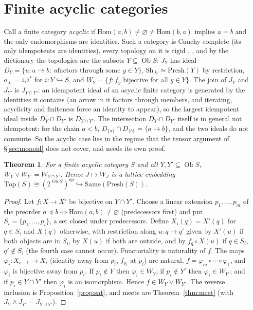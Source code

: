 \documentclass[11pt]{amsart}
\newtheorem{thm}{Theorem}[section]
\theoremstyle{definition}
\newcommand{\Same}{\mathrm{Same}}
\newcommand{\Top}{\mathrm{Top}}
\newcommand{\Presh}{\mathrm{Presh}}
\newcommand{\Sh}{\mathrm{Sh}}
\newcommand{\Hom}{\mathrm{Hom}}
\begin{document}
\section{Finite acyclic categories}\label{sec:acyclic}

Call a finite category \emph{acyclic} if $\Hom(a,b)\neq\varnothing\neq\Hom(b,a)$
implies $a=b$ and the only endomorphisms are identities. Such a category is
Cauchy complete (its only idempotents are identities), every topology on it is
rigid \cite[C2.2.21]{Elephant}, \cite{Marques25}, and by the dictionary the topologies are the subsets
$Y\subseteq\operatorname{Ob}S$: $J_Y$ has ideal $D_Y=\{u\colon a\to b:\ u\text{
factors through some }y\in Y\}$, $\Sh_{J_Y}\simeq\Presh(Y)$ by restriction,
$a_{J_Y}=i_*i^*$ for $i\colon Y\hookrightarrow S$, and
$W_Y=\{f: f_y\text{ bijective for all }y\in Y\}$. The join of $J_Y$ and $J_{Y'}$
is $J_{Y\cap Y'}$: an idempotent ideal of an acyclic finite category is
generated by the identities it contains (an arrow in it factors through
members, and iterating, acyclicity and finiteness force an identity to
appear), so the largest idempotent ideal inside $D_Y\cap D_{Y'}$ is
$D_{Y\cap Y'}$. The intersection $D_Y\cap D_{Y'}$ itself is in general not
idempotent: for the chain $a<b$, $D_{\{a\}}\cap D_{\{b\}}=\{a\to b\}$, and the
two ideals do not commute. So the acyclic case lies in the regime that the
tensor argument of \S\ref{sec:monoid} does not cover, and needs its own proof.

\begin{thm}\label{thm:acyclic}
For a finite acyclic category $S$ and all $Y,Y'\subseteq\operatorname{Ob}S$,
$W_Y\vee W_{Y'}=W_{Y\cap Y'}$. Hence $J\mapsto W_J$ is a lattice embedding
$\Top(S)\cong(2^{\operatorname{Ob}S})^{\mathrm{op}}\hookrightarrow\Same(\Presh(S))$.
\end{thm}
\begin{proof}
Let $f\colon X\to X'$ be bijective on $Y\cap Y'$. Choose a linear extension
$p_1,\dots,p_m$ of the preorder $a\preceq b\iff\Hom(a,b)\neq\varnothing$
(predecessors first) and put $S_i=\{p_1,\dots,p_i\}$, a set closed under
predecessors. Define $X_i(q)=X'(q)$ for $q\in S_i$ and $X(q)$ otherwise, with
restriction along $u\colon q\to q'$ given by $X'(u)$ if both objects are in
$S_i$, by $X(u)$ if both are outside, and by $f_q\circ X(u)$ if $q\in S_i$,
$q'\notin S_i$ (the fourth case cannot occur). Functoriality is naturality of
$f$. The maps $\varphi_i\colon X_{i-1}\to X_i$ (identity away from $p_i$,
$f_{p_i}$ at $p_i$) are natural, $f=\varphi_m\circ\cdots\circ\varphi_1$, and
$\varphi_i$ is bijective away from $p_i$. If $p_i\notin Y$ then
$\varphi_i\in W_Y$; if $p_i\notin Y'$ then $\varphi_i\in W_{Y'}$; and if
$p_i\in Y\cap Y'$ then $\varphi_i$ is an isomorphism. Hence $f\in W_Y\vee W_{Y'}$.
The reverse inclusion is Proposition~\ref{prop:sat}, and meets are
Theorem~\ref{thm:meet} (with $J_Y\wedge J_{Y'}=J_{Y\cup Y'}$).
\end{proof}
\end{document}
